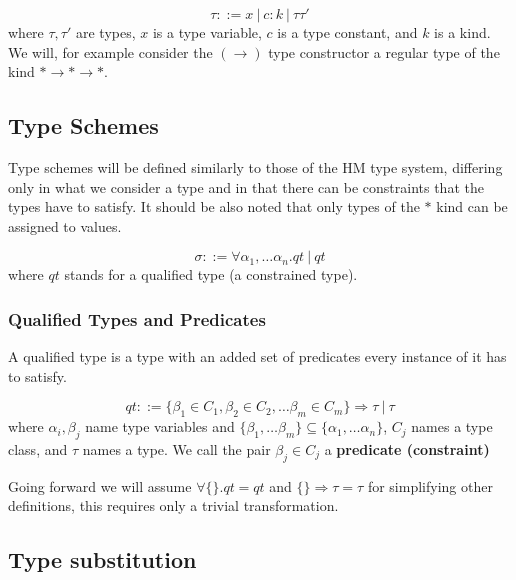\begin{defn}[types]
    $$\tau ::= x\ |\ c : k\ |\ \tau \tau'$$
    where $\tau, \tau'$ are types, $x$ is a type variable, $c$ is a type constant, and $k$ is a kind. We will, for example consider the $(\rightarrow)$ type constructor a regular type of the kind $* \rightarrow * \rightarrow *$.
\end{defn}

\subsection{Type Schemes}

Type schemes will be defined similarly to those of the HM type system, differing only in what we consider a type and in that there can be constraints that the types have to satisfy. It should be also noted that only types of the $*$ kind can be assigned to values.

\begin{defn}
    $$\sigma ::= \forall \alpha_1, \dots \alpha_n . qt\ |\ qt$$
    where $qt$ stands for a qualified type (a constrained type).
\end{defn}

\subsubsection{Qualified Types and Predicates}

A qualified type is a type with an added set of predicates every instance of it has to satisfy.

\begin{defn}
    $$qt ::= \{\beta_1 \in C_1, \beta_2 \in C_2, \dots \beta_m \in C_m\} \Rightarrow \tau\ |\ \tau$$
    where $\alpha_i, \beta_j$ name type variables and $\{\beta_1, \dots \beta_m\} \subseteq \{\alpha_1, \dots \alpha_n\}$, $C_j$ names a type class, and $\tau$ names a type. We call the pair $\beta_j \in C_j$ a \textbf{predicate (constraint)} %
\end{defn}

Going forward we will assume $\forall \{\}. qt = qt$ and $\{\} \Rightarrow \tau = \tau$ for simplifying other definitions, this requires only a trivial transformation. %

\subsection{Type substitution}

